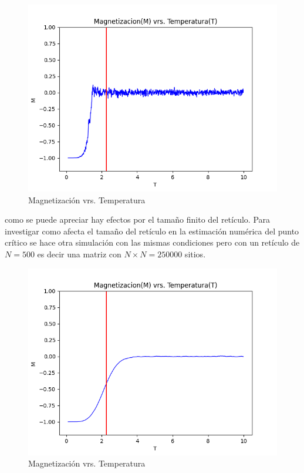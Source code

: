 \documentclass[a4paper]{article}
\begin{document}
\begin{figure}[H]
\begin{center}
\includegraphics[scale=0.6]{PlotMvT_sim1_v02.png} 
\end{center} 
\caption{Magnetización vrs. Temperatura}
\end{figure}
como se puede apreciar hay efectos por el tamaño finito del retículo. Para investigar como afecta el tamaño del retículo en la estimación numérica del punto crítico se hace otra simulación con las mismas condiciones pero con un retículo de $N=500$ es decir una matriz con $N\times N=250000$ sitios.
\begin{figure}[H]
\begin{center}
\includegraphics[scale=0.6]{PlotMvT_sim1_v03.png} 
\end{center} 
\caption{Magnetización vrs. Temperatura}
\end{figure}
\end{document}
